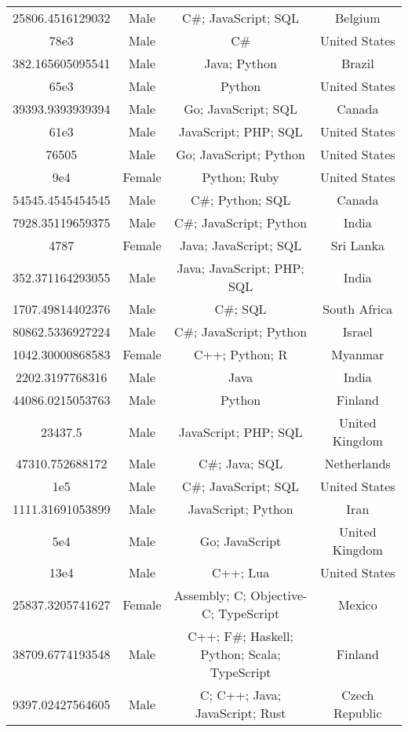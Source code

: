 \begin{center}
\begin{tabular}{ |c|c|c|c| }
25806.4516129032  &  Male  &  C\#; JavaScript; SQL  &  Belgium  \\ 
78e3  &  Male  &  C\#  &  United States  \\ 
382.165605095541  &  Male  &  Java; Python  &  Brazil  \\ 
65e3  &  Male  &  Python  &  United States  \\ 
39393.9393939394  &  Male  &  Go; JavaScript; SQL  &  Canada  \\ 
61e3  &  Male  &  JavaScript; PHP; SQL  &  United States  \\ 
76505  &  Male  &  Go; JavaScript; Python  &  United States  \\ 
9e4  &  Female  &  Python; Ruby  &  United States  \\ 
54545.4545454545  &  Male  &  C\#; Python; SQL  &  Canada  \\ 
7928.35119659375  &  Male  &  C\#; JavaScript; Python  &  India  \\ 
4787  &  Female  &  Java; JavaScript; SQL  &  Sri Lanka  \\ 
352.371164293055  &  Male  &  Java; JavaScript; PHP; SQL  &  India  \\ 
1707.49814402376  &  Male  &  C\#; SQL  &  South Africa  \\ 
80862.5336927224  &  Male  &  C\#; JavaScript; Python  &  Israel  \\ 
1042.30000868583  &  Female  &  C++; Python; R  &  Myanmar  \\ 
2202.3197768316  &  Male  &  Java  &  India  \\ 
44086.0215053763  &  Male  &  Python  &  Finland  \\ 
23437.5  &  Male  &  JavaScript; PHP; SQL  &  United Kingdom  \\ 
47310.752688172  &  Male  &  C\#; Java; SQL  &  Netherlands  \\ 
1e5  &  Male  &  C\#; JavaScript; SQL  &  United States  \\ 
1111.31691053899  &  Male  &  JavaScript; Python  &  Iran  \\ 
5e4  &  Male  &  Go; JavaScript  &  United Kingdom  \\ 
13e4  &  Male  &  C++; Lua  &  United States  \\ 
25837.3205741627  &  Female  &  Assembly; C; Objective-C; TypeScript  &  Mexico  \\ 
38709.6774193548  &  Male  &  C++; F\#; Haskell; Python; Scala; TypeScript  &  Finland  \\ 
9397.02427564605  &  Male  &  C; C++; Java; JavaScript; Rust  &  Czech Republic  \\ 

\end{tabular}
\end{center}
